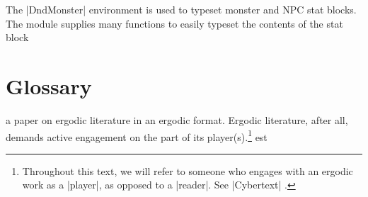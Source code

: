 \documentclass[letterpaper,twocolumn,openany,nodeprecatedcode]{dndbook}
\begin{document}
The |DndMonster| environment is used to typeset monster and NPC stat blocks. The module supplies many functions to easily typeset the contents of the stat block



\part{Glossary}
 a paper on ergodic literature in an ergodic format.  Ergodic literature, after all, demands active engagement on the part of its player(s).\footnote{ Throughout this text, we will refer to someone who engages with an ergodic work as a |player|, as opposed to a |reader|. See |Cybertext| .}
est

\end{document}
